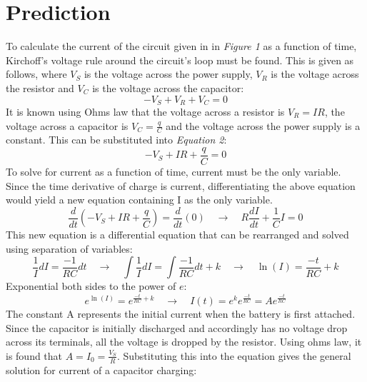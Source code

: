 \documentclass[12pt,letterpaper]{article}
\begin{document}
\section*{Prediction}
To calculate the current of the circuit given in in \textit{Figure 1} as a function of time, Kirchoff's voltage rule around the circuit's loop must be found. This is given as follows, where $V_S$ is the voltage across the power supply, $V_R$ is the voltage across the resistor and $V_C$ is the voltage across the capacitor:
\begin{equation}
-V_S + V_R + V_C = 0
\end{equation} 
It is known using Ohms law that the voltage across a resistor is $V_R = IR$, the voltage across a capacitor is $V_C = \frac{q}{C}$ and the voltage across the power supply is a constant. This can be substituted into \textit{Equation 2}:
\begin{equation}
-V_S + IR + \frac{q}{C} = 0
\end{equation}
To solve for current as a function of time, current must be the only variable. Since the time derivative of charge is current, differentiating the above equation would yield a new equation containing I as the only variable.
\begin{equation}
\frac{d}{dt}(-V_S + IR + \frac{q}{C}) = \frac{d}{dt}(0)\hspace{12pt} \longrightarrow\hspace{12pt} R\frac{dI}{dt} + \frac{1}{C}I = 0
\end{equation}
This new equation is a differential equation that can be rearranged and solved using separation of variables:
\begin{equation}
\frac{1}{I}dI = \frac{-1}{RC}dt\hspace{12pt}\longrightarrow\hspace{12pt} \int\frac{1}{I}dI = \int\frac{-1}{RC}dt + k \hspace{12pt}\longrightarrow\hspace{12pt} \ln(I)= \frac{-t}{RC} + k
\end{equation}
Exponential both sides to the power of $e$:
\begin{equation}
e^{\ln(I)} = e^{\frac{-t}{RC} + k}\hspace{12pt} \longrightarrow\hspace{12pt} I(t) = e^ke^{\frac{-t}{RC}} = Ae^{\frac{-t}{RC}}
\end{equation}
\pagebreak
The constant A represents the initial current when the battery is first attached. Since the capacitor is initially discharged and accordingly has no voltage drop across its terminals, all the voltage is dropped by the resistor. Using ohms law, it is found that $A=I_0 = \frac{V_S}{R}$. Substituting this into the equation gives the general solution for current of a capacitor charging:
\end{document}
